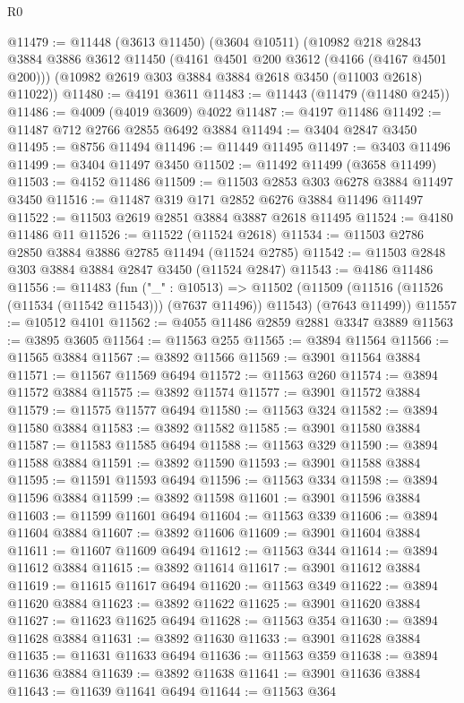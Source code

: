\begin{lexlean}{R0}
\begin{coremodule}
@11479 := @11448
    (@3613 @11450)
    (@3604 @10511)
    (@10982
      @218
      @2843
      @3884
      @3886
      @3612
      @11450
      (@4161 @4501 @200 @3612 (@4166 (@4167 @4501 @200)))
      (@10982 @2619 @303 @3884 @3884 @2618 @3450 (@11003 @2618) @11022))
@11480 := @4191 @3611
@11483 := @11443 (@11479 (@11480 @245))
@11486 := @4009 (@4019 @3609) @4022
@11487 := @4197 @11486
@11492 := @11487 @712 @2766 @2855 @6492 @3884
@11494 := @3404 @2847 @3450
@11495 := @8756 @11494
@11496 := @11449 @11495
@11497 := @3403 @11496
@11499 := @3404 @11497 @3450
@11502 := @11492 @11499 (@3658 @11499)
@11503 := @4152 @11486
@11509 := @11503 @2853 @303 @6278 @3884 @11497 @3450
@11516 := @11487 @319 @171 @2852 @6276 @3884 @11496 @11497
@11522 := @11503 @2619 @2851 @3884 @3887 @2618 @11495
@11524 := @4180 @11486 @11
@11526 := @11522 (@11524 @2618)
@11534 := @11503 @2786 @2850 @3884 @3886 @2785 @11494 (@11524 @2785)
@11542 := @11503 @2848 @303 @3884 @3884 @2847 @3450 (@11524 @2847)
@11543 := @4186 @11486
@11556 := @11483
    (fun ("_" : @10513) =>
    @11502 (@11509 (@11516 (@11526 (@11534 (@11542 @11543))) (@7637 @11496)) @11543) (@7643 @11499))
@11557 := @10512 @4101
@11562 := @4055 @11486 @2859 @2881 @3347 @3889
@11563 := @3895 @3605
@11564 := @11563 @255
@11565 := @3894 @11564
@11566 := @11565 @3884
@11567 := @3892 @11566
@11569 := @3901 @11564 @3884
@11571 := @11567 @11569 @6494
@11572 := @11563 @260
@11574 := @3894 @11572 @3884
@11575 := @3892 @11574
@11577 := @3901 @11572 @3884
@11579 := @11575 @11577 @6494
@11580 := @11563 @324
@11582 := @3894 @11580 @3884
@11583 := @3892 @11582
@11585 := @3901 @11580 @3884
@11587 := @11583 @11585 @6494
@11588 := @11563 @329
@11590 := @3894 @11588 @3884
@11591 := @3892 @11590
@11593 := @3901 @11588 @3884
@11595 := @11591 @11593 @6494
@11596 := @11563 @334
@11598 := @3894 @11596 @3884
@11599 := @3892 @11598
@11601 := @3901 @11596 @3884
@11603 := @11599 @11601 @6494
@11604 := @11563 @339
@11606 := @3894 @11604 @3884
@11607 := @3892 @11606
@11609 := @3901 @11604 @3884
@11611 := @11607 @11609 @6494
@11612 := @11563 @344
@11614 := @3894 @11612 @3884
@11615 := @3892 @11614
@11617 := @3901 @11612 @3884
@11619 := @11615 @11617 @6494
@11620 := @11563 @349
@11622 := @3894 @11620 @3884
@11623 := @3892 @11622
@11625 := @3901 @11620 @3884
@11627 := @11623 @11625 @6494
@11628 := @11563 @354
@11630 := @3894 @11628 @3884
@11631 := @3892 @11630
@11633 := @3901 @11628 @3884
@11635 := @11631 @11633 @6494
@11636 := @11563 @359
@11638 := @3894 @11636 @3884
@11639 := @3892 @11638
@11641 := @3901 @11636 @3884
@11643 := @11639 @11641 @6494
@11644 := @11563 @364

\end{coremodule}
\end{lexlean}
